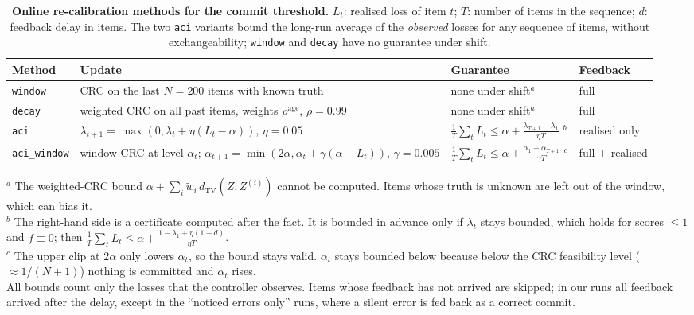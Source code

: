 \begin{table}[H]
  \centering
  \caption{\textbf{Online re-calibration methods for the commit threshold.} $L_t$: realised loss of item $t$; $T$: number of items in the sequence; $d$: feedback delay in items. The two \texttt{aci} variants bound the long-run average of the \emph{observed} losses for any sequence of items, without exchangeability; \texttt{window} and \texttt{decay} have no guarantee under shift.}
  \label{tab:online}
  \small
  \begin{adjustbox}{max width=\linewidth}\begin{tabular}{@{}llll@{}}
    \toprule
    \textbf{Method} & \textbf{Update} & \textbf{Guarantee} & \textbf{Feedback} \\
    \midrule
    \texttt{window} & CRC on the last $N = 200$ items with known truth & none under shift$^{a}$ & full \\
    \texttt{decay} & weighted CRC on all past items, weights $\rho^{\text{age}}$, $\rho = 0.99$ & none under shift$^{a}$ & full \\
    \texttt{aci} & $\lambda_{t+1} = \max(0, \lambda_t + \eta(L_t - \alpha))$, $\eta = 0.05$ & $\frac1T\sum_t L_t \le \alpha + \frac{\lambda_{T+1} - \lambda_1}{\eta T}$ $^{b}$ & realised only \\
    \texttt{aci\_window} & window CRC at level $\alpha_t$; $\alpha_{t+1} = \min(2\alpha, \alpha_t + \gamma(\alpha - L_t))$, $\gamma = 0.005$ & $\frac1T\sum_t L_t \le \alpha + \frac{\alpha_1 - \alpha_{T+1}}{\gamma T}$ $^{c}$ & full + realised \\
    \bottomrule
  \end{tabular}\end{adjustbox}
  \begin{minipage}{\linewidth}\footnotesize\smallskip
  $^{a}$ The weighted-CRC bound $\alpha + \sum_i \tilde w_i\, d_{\mathrm{TV}}(Z, Z^{(i)})$ \citep{barber2023beyond,farinhas2024nonexch} cannot be computed. Items whose truth is unknown are left out of the window, which can bias it. \\
  $^{b}$ The right-hand side is a certificate computed after the fact. It is bounded in advance only if $\lambda_t$ stays bounded, which holds for scores $\le 1$ and $f \equiv 0$; then $\frac1T\sum_t L_t \le \alpha + \frac{1 - \lambda_1 + \eta(1+d)}{\eta T}$. \\
  $^{c}$ The upper clip at $2\alpha$ only lowers $\alpha_t$, so the bound stays valid. $\alpha_t$ stays bounded below because below the CRC feasibility level ($\approx 1/(N+1)$) nothing is committed and $\alpha_t$ rises. \\
  All bounds count only the losses that the controller observes. Items whose feedback has not arrived are skipped; in our runs all feedback arrived after the delay, except in the ``noticed errors only'' runs, where a silent error is fed back as a correct commit.
  \end{minipage}
\end{table}

